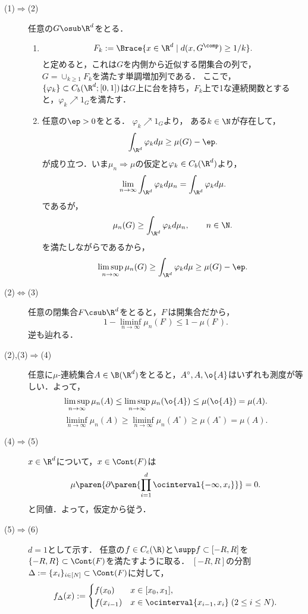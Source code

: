 \documentclass[uplatex,dvipdfmx]{jsreport}
\begin{document}
\begin{Proof}\mbox{}
    \begin{description}
        \item[(1)$\Rightarrow$(2)] 任意の$G\osub\R^d$をとる．
        \begin{enumerate}[{Step}1]
            \item \[F_k:=\Brace{x\in\R^d\mid d(x,G^\comp)\ge1/k}.\]
            と定めると，これは$G$を内側から近似する閉集合の列で，$G=\cup_{k\ge1}F_k$を満たす単調増加列である．
            ここで，$\{\varphi_k\}\subset C_b(\R^d;[0,1])$は$G$上に台を持ち，$F_k$上で1な連続関数とすると，$\varphi_k\nearrow 1_G$を満たす．
            \item 任意の$\ep>0$をとる．
            $\varphi_k\nearrow1_G$より，
            ある$k\in\N$が存在して，
            \[\int_{\R^d}\varphi_kd\mu\ge\mu(G)-\ep.\]
            が成り立つ．いま$\mu_n\Rightarrow\mu$の仮定と$\varphi_k\in C_b(\R^d)$より，
            \[\lim_{n\to\infty}\int_{\R^d}\varphi_kd\mu_n=\int_{\R^d}\varphi_kd\mu.\]
            であるが，
            \[\mu_n(G)\ge\int_{\R^d}\varphi_kd\mu_n,\qquad n\in\N.\]
            を満たしながらであるから，
            \[\limsup_{n\to\infty}\mu_n(G)\ge\int_{\R^d}\varphi_kd\mu\ge\mu(G)-\ep.\]
        \end{enumerate}
        \item[(2)$\Leftrightarrow$(3)] 任意の閉集合$F\csub\R^d$をとると，$F^\comp$は開集合だから，
        \[1-\liminf_{n\to\infty}\mu_n(F^\comp)\le 1-\mu(F^\comp).\]
        逆も辿れる．
        \item[(2),(3)$\Rightarrow$(4)] 任意に$\mu$-連続集合$A\in\B(\R^d)$をとると，$A^\circ,A,\o{A}$はいずれも測度が等しい．よって，
        \[\limsup_{n\to\infty}\mu_n(A)\le\limsup_{n\to\infty}\mu_n(\o{A})\le\mu(\o{A})=\mu(A).\]
        \[\liminf_{n\to\infty}\mu_n(A)\ge\liminf_{n\to\infty}\mu_n(A^\circ)\ge\mu(A^\circ)=\mu(A).\]
        \item[(4)$\Rightarrow$(5)] $x\in\R^d$について，$x\in\Cont(F)$は
        \[\mu\paren{\partial\paren{\prod_{i=1}^d\ocinterval{-\infty,x_i}}}=0.\]
        と同値．よって，仮定から従う．
        \item[(5)$\Rightarrow$(6)] $d=1$として示す．
        任意の$f\in C_c(\R)$と$\supp f\subset[-R,R]$を$\{-R,R\}\subset\Cont(F)$を満たすように取る．
        $[-R,R]$の分割$\Delta:=\{x_i\}_{i\in[N]}\subset\Cont(F)$に対して，
        \[f_\Delta(x):=\begin{cases}
            f(x_0)&x\in[x_0,x_1],\\
            f(x_{i-1})&x\in\ocinterval{x_{i-1},x_i}\;(2\le i\le N).

\end{cases}\]
\end{description}
\end{Proof}
\end{document}
